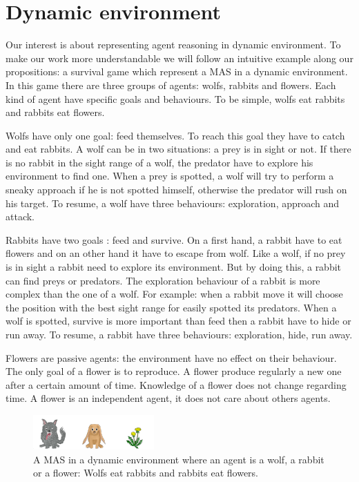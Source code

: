 \documentclass{aamas2012}
\begin{document}
\section{Dynamic environment}

	Our interest is about representing agent reasoning in dynamic environment.
	To make our work more understandable we will follow an intuitive example along our propositions: a survival game which represent a MAS in a dynamic environment.
	In this game there are three groups of agents: wolfs, rabbits and flowers.
	Each kind of agent have specific goals and behaviours.
	To be simple, wolfs eat rabbits and rabbits eat flowers.
	
	Wolfs have only one goal: feed themselves.
	To reach this goal they have to catch and eat rabbits.
	A wolf can be in two situations: a prey is in sight or not.
	If there is no rabbit in the sight range of a wolf, the predator have to explore his environment to find one.
	When a prey is spotted, a wolf will try to perform a sneaky approach if he is not spotted himself, otherwise the predator will rush on his target.
	To resume, a wolf have three behaviours: exploration, approach and attack.
	
	Rabbits have two goals : feed and survive.
	On a first hand, a rabbit have to eat flowers and on an other hand it have to escape from wolf.
	Like a wolf, if no prey is in sight a rabbit need to explore its environment.
	But by doing this, a rabbit can find preys or predators.
	The exploration behaviour of a rabbit is more complex than the one of a wolf.
	For example: when a rabbit move it will choose the position with the best sight range for easily spotted its predators.
	When a wolf is spotted, survive is more important than feed then a rabbit have to hide or run away.
	To resume, a rabbit have three behaviours: exploration, hide, run away.
	
	Flowers are passive agents: the environment have no effect on their behaviour.
	The only goal of a flower is to reproduce.
	A flower produce regularly a new one after a certain amount of time.
	Knowledge of a flower does not change regarding time.
	A flower is an independent agent, it does not care about others agents.

	\begin{figure}
		\centering
		\includegraphics[keepaspectratio=true,scale=3.0]{food_chain.pdf}
		\caption
		{
			\label{food_chain}
			A MAS in a dynamic environment where an agent is a wolf, a rabbit or a flower:
			Wolfs eat rabbits and rabbits eat flowers.
		}
	\end{figure}
\end{document}
